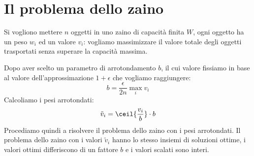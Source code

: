 \documentclass[\main/main.tex]{subfiles}
\begin{document}
\section{Il problema dello zaino}
\begin{problem}
    Si vogliono mettere \(n\) oggetti in uno zaino di capacità finita \(W\), ogni oggetto ha un peso \(w_i\) ed un valore \(v_i\): vogliamo massimizzare il valore totale degli oggetti trasportati senza superare la capacità massima.
\end{problem}
\begin{definition}
    Dopo aver scelto un parametro di arrotondamento \(b\), il cui valore fissiamo in base al valore dell'approssimazione \(1+\epsilon\) che vogliamo raggiungere:
    \[
        b = \frac{\epsilon}{2n}\max_i v_i
    \]
    Calcoliamo i pesi arrotondati:
    \[
        \tilde{v}_i = \ceil{\frac{v_i}{b}}\cdot b
    \]
    Procediamo quindi a risolvere il problema dello zaino con i pesi arrotondati. Il problema dello zaino con i valori \(\tilde{v}_i\) hanno lo stesso insiemi di soluzioni ottime, i valori ottimi differiscono di un fattore \(b\) e i valori scalati sono interi.
\end{definition}
\clearpage
\end{document}
